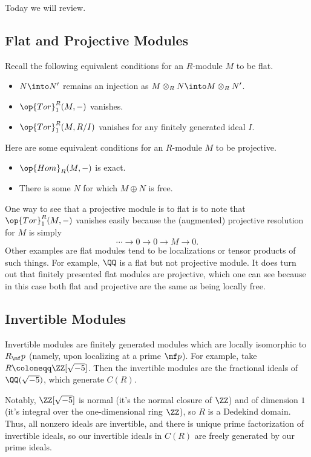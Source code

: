 
Today we will review.

\subsection{Flat and Projective Modules}
Recall the following equivalent conditions for an $R$-module $M$ to be flat.
\begin{itemize}
	\item $N\into N'$ remains an injection as $M\otimes_RN\into M\otimes_RN'$.
	\item $\op{Tor}_1^R(M,-)$ vanishes.
	\item $\op{Tor}_1^R(M,R/I)$ vanishes for any finitely generated ideal $I$.
\end{itemize}
Here are some equivalent conditions for an $R$-module $M$ to be projective.
\begin{itemize}
	\item $\op{Hom}_R(M,-)$ is exact.
	\item There is some $N$ for which $M\oplus N$ is free.
\end{itemize}
One way to see that a projective module is to flat is to note that $\op{Tor}_1^R(M,-)$ vanishes easily because the (augmented) projective resolution for $M$ is simply
\[\cdots\to0\to0\to M\to0.\]
Other examples are flat modules tend to be localizations or tensor products of such things. For example, $\QQ$ is a flat but not projective module. It does turn out that finitely presented flat modules are projective, which one can see because in this case both flat and projective are the same as being locally free.

\subsection{Invertible Modules}
Invertible modules are finitely generated modules which are locally isomorphic to $R_\mf p$ (namely, upon localizing at a prime $\mf p$). For example, take $R\coloneqq\ZZ[\sqrt{-5}]$. Then the invertible modules are the fractional ideals of $\QQ(\sqrt{-5})$, which generate $C(R)$.

Notably, $\ZZ[\sqrt{-5}]$ is normal (it's the normal closure of $\ZZ$) and of dimension $1$ (it's integral over the one-dimensional ring $\ZZ$), so $R$ is a Dedekind domain. Thus, all nonzero ideals are invertible, and there is unique prime factorization of invertible ideals, so our invertible ideals in $C(R)$ are freely generated by our prime ideals.


